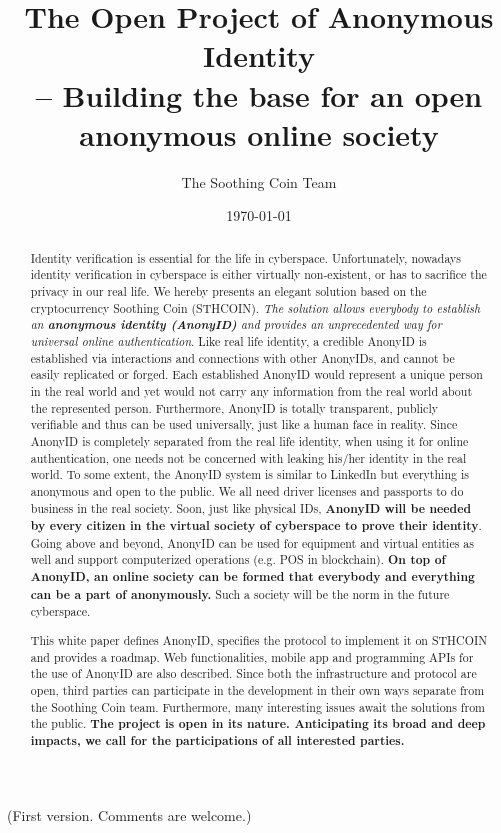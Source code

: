 \documentclass[12pt, a4paper]{article}
\begin{document}
\title{The Open Project of Anonymous Identity \\
       \large -- Building the base for an open anonymous online society
       }
\author {The Soothing Coin Team}

\date{\today}

\maketitle


\begin{center}
(First version. Comments are welcome.)
\end{center}

\begin{abstract}
Identity verification is essential for the life in cyberspace. Unfortunately, nowadays identity verification in cyberspace is either virtually non-existent, or has to sacrifice the privacy in our real life. We hereby presents an elegant solution based on the cryptocurrency Soothing Coin (STHCOIN). \textit{The solution allows everybody to establish an \textbf{anonymous identity (AnonyID)} and provides an unprecedented way for universal online authentication}. Like real life identity, a credible AnonyID is established via interactions and connections with other AnonyIDs, and cannot be easily replicated or forged. Each established AnonyID would represent a unique person in the real world and yet would not carry any information from the real world about the represented person. Furthermore, AnonyID is totally transparent, publicly verifiable and thus can be used universally, just like a human face in reality. Since AnonyID is completely separated from the real life identity, when using it for online authentication, one needs not be concerned with leaking his/her identity in the real world. To some extent, the AnonyID system is similar to LinkedIn but everything is anonymous and open to the public. We all need driver licenses and passports to do business in the real society. Soon, just like physical IDs, \textbf{AnonyID will be needed by every citizen in the virtual society of cyberspace to prove their identity}. Going above and beyond, AnonyID can be used for equipment and virtual entities as well and support computerized operations (e.g. POS in blockchain). \textbf{On top of AnonyID, an online society can be formed that everybody and everything can be a part of anonymously.} Such a society will be the norm in the future cyberspace.

This white paper defines AnonyID, specifies the protocol to implement it on STHCOIN and provides a roadmap. Web functionalities, mobile app and programming APIs for the use of AnonyID are also described. Since both the infrastructure and protocol are open, third parties can participate in the development in their own ways separate from the Soothing Coin team. Furthermore, many interesting issues await the solutions from the public. \textbf{The project is open in its nature. Anticipating its broad and deep impacts, we call for the participations of all interested parties.}
 
\end{abstract}
\end{document}
